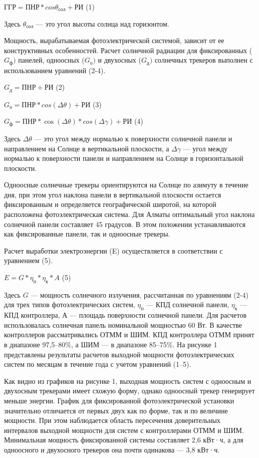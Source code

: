\begin{multicols}{2}
\(ГГР = ПНР*cos\theta_{сол} + РИ\) (1)

Здесь \(\theta_{сол}\) --- это угол высоты солнца над горизонтом.

Мощность, вырабатываемая фотоэлектрической системой, зависит от ее
конструктивных особенностей. Расчет солнечной радиации для фиксированных
(\(G_{ф})\) панелей, одноосных (\(G_{о})\) и двухосных (\(G_{д})\)
солнечных трекеров выполнен с использованием уравнений (2-4).

\(G_{д} = ПНР + РИ\) (2)

\(G_{о} = ПНР*cos(\Delta\theta) + РИ\) (3)

\(G_{ф} = ПНР*\cos(\Delta\theta)*cos(\Delta\gamma) + РИ\) (4)

Здесь \(\Delta\theta\) --- это угол между нормалью к поверхности
солнечной панели и направлением на Солнце в вертикальной плоскости, а
\(\Delta\gamma\) --- угол между нормалью к поверхности панели и
направлением на Солнце в горизонтальной плоскости.

Одноосные солнечные трекеры ориентируются на Солнце по азимуту в течение
дня, при этом угол наклона панели в вертикальной плоскости остается
фиксированным и определяется географической широтой, на которой
расположена фотоэлектрическая система. Для Алматы оптимальный угол
наклона солнечной панели составляет 45 градусов. В этом положении
устанавливаются как фиксированные панели, так и одноосные трекеры.

Расчет выработки электроэнергии (E) осуществляется в соответствии с
уравнением (5).

\(E = G*\eta_{п}*\eta_{к}*A\) (5)

Здесь \(G\) --- мощность солнечного излучения, рассчитанная по
уравнениям (2-4) для трех типов фотоэлектрических систем, \(\eta_{п}\)
--- КПД солнечной панели, \(\eta_{к}\) --- КПД контроллера, А ---
площадь поверхности солнечной панели. Для расчетов использовалась
солнечная панель номинальной мощностью 60 Вт. В качестве контроллеров
рассматривались ОТММ и ШИМ. КПД контроллера ОТММ принят в диапазоне
97,5--80\%, а ШИМ --- в диапазоне 85--75\%. На рисунке 1 представлены
результаты расчетов выходной мощности фотоэлектрических систем по
месяцам в течение года с учетом уравнений (1--5).

Как видно из графиков на рисунке 1, выходная мощность систем с одноосным
и двухосным трекерами имеет схожую форму, однако одноосный трекер
генерирует меньше энергии. График для фиксированной фотоэлектрической
установки значительно отличается от первых двух как по форме, так и по
величине мощности. При этом наблюдается область пересечения
доверительных интервалов выходной мощности для систем с контроллерами
ОТММ и ШИМ. Минимальная мощность фиксированной системы составляет 2,6
кВт·ч, а для одноосного и двухосного трекеров она почти одинакова ---
3,8 кВт·ч.


\end{multicols}
